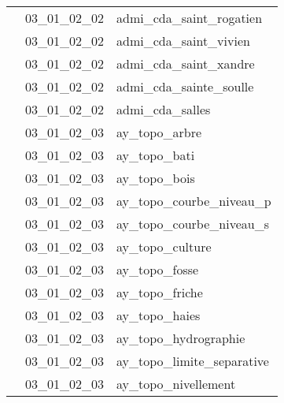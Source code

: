 \documentclass[12pt,titlepage,oneside]{book}
\begin{document}
\begin{supertabular}{|p{10cm}|c|p{15cm}|}
                    & 03\_01\_02\_02 & admi\_cda\_saint\_rogatien\\


                    & 03\_01\_02\_02 & admi\_cda\_saint\_vivien\\


                    & 03\_01\_02\_02 & admi\_cda\_saint\_xandre\\


                    & 03\_01\_02\_02 & admi\_cda\_sainte\_soulle\\


                    & 03\_01\_02\_02 & admi\_cda\_salles\\


                    & 03\_01\_02\_03 & ay\_topo\_arbre\\


                    & 03\_01\_02\_03 & ay\_topo\_bati\\


                    & 03\_01\_02\_03 & ay\_topo\_bois\\


                    & 03\_01\_02\_03 & ay\_topo\_courbe\_niveau\_p\\


                    & 03\_01\_02\_03 & ay\_topo\_courbe\_niveau\_s\\


                    & 03\_01\_02\_03 & ay\_topo\_culture\\


                    & 03\_01\_02\_03 & ay\_topo\_fosse\\


                    & 03\_01\_02\_03 & ay\_topo\_friche\\


                    & 03\_01\_02\_03 & ay\_topo\_haies\\


                    & 03\_01\_02\_03 & ay\_topo\_hydrographie\\


                    & 03\_01\_02\_03 & ay\_topo\_limite\_separative\\


                    & 03\_01\_02\_03 & ay\_topo\_nivellement\\



\end{supertabular}
\end{document}
